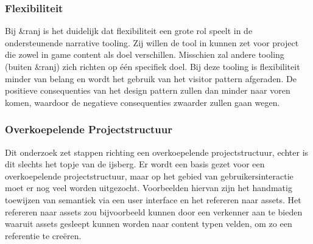 \subsubsection{Flexibiliteit}
Bij \&ranj is het duidelijk dat flexibiliteit een grote rol speelt in de ondersteunende narrative tooling. Zij willen de tool in kunnen zet voor project die zowel in game content als doel verschillen. Misschien zal andere tooling (buiten \&ranj) zich richten op één specifiek doel. Bij deze tooling is flexibiliteit minder van belang en wordt het gebruik van het visitor pattern afgeraden. De positieve consequenties van het design pattern zullen dan minder naar voren komen, waardoor de negatieve consequenties zwaarder zullen gaan wegen.

\subsubsection{Overkoepelende Projectstructuur}
Dit onderzoek zet stappen richting een overkoepelende projectstructuur, echter is dit slechts het topje van de ijsberg. Er wordt een basis gezet voor een overkoepelende projectstructuur, maar op het gebied van gebruikersinteractie moet er nog veel worden uitgezocht. Voorbeelden hiervan zijn het handmatig toewijzen van semantiek via een user interface en het refereren naar assets. Het refereren naar assets zou bijvoorbeeld kunnen door een verkenner aan te bieden waaruit assets gesleept kunnen worden naar content typen velden, om zo een referentie te creëren.